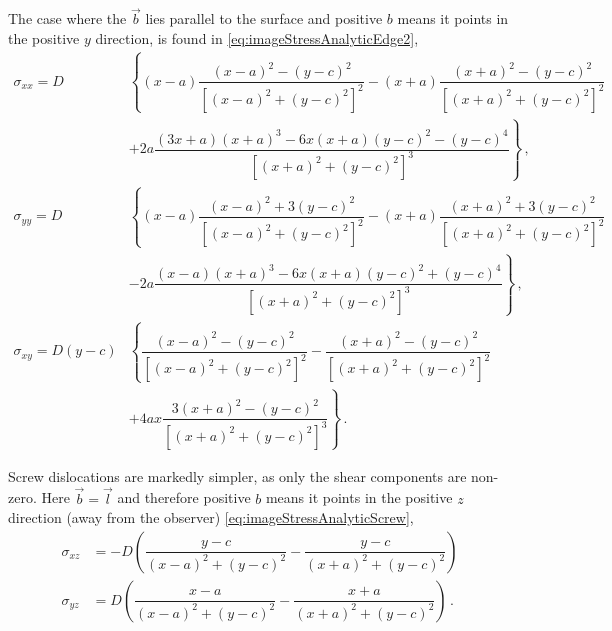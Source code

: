 \documentclass[11pt]{iopart}
\begin{document}
The case where the $\vec{b}$ lies parallel to the surface and positive $b$ means it points in the positive $y$ direction, is found in \cref{eq:imageStressAnalyticEdge2},
\begin{subequations}
    \begin{align}\label{eq:imageStressAnalyticEdge2}
        \sigma_{xx} = D         & \left\{ (x - a) \dfrac{(x - a)^2 - (y - c)^2}{[(x - a)^2 + (y - c)^2]^2} -(x + a) \dfrac{(x + a)^2 - (y - c)^2}{[(x + a)^2 + (y - c)^2]^2} \right.     \\\nonumber
                                & \left. + 2 a \dfrac{(3 x + a) (x + a)^3 - 6 x (x + a) (y - c)^2 - (y - c)^4}{[(x + a)^2 + (y - c)^2]^3}\right\}\,,                                     \\
        \sigma_{yy} = D         & \left\{ (x - a) \dfrac{(x - a)^2 + 3 (y - c)^2}{[(x - a)^2 + (y - c)^2]^2} - (x + a) \dfrac{(x + a)^2 + 3 (y - c)^2}{[(x + a)^2 + (y - c)^2]^2}\right. \\\nonumber
                                & \left. - 2 a \dfrac{(x - a) (x + a)^3 - 6 x (x + a) (y - c)^2 + (y - c)^4}{[(x + a)^2 + (y - c)^2]^3}\right\}\,,                                       \\
        \sigma_{xy} = D (y - c) & \left\{\dfrac{(x - a)^2 - (y - c)^2}{[(x - a)^2 + (y - c)^2]^2} - \dfrac{(x + a)^2 - (y - c)^2}{[(x + a)^2 + (y - c)^2]^2} \right.                     \\\nonumber
                                & \left. + 4 a x \dfrac{3 (x + a)^2 - (y - c)^2}{[(x + a)^2 + (y - c)^2]^3}\right\}\,.
    \end{align}
\end{subequations}

Screw dislocations are markedly simpler, as only the shear components are non-zero. Here $\vec{b} = \vec{l}$ and therefore positive $b$ means it points in the positive $z$ direction (away from the observer) \cref{eq:imageStressAnalyticScrew},
\begin{subequations}
    \begin{align}\label{eq:imageStressAnalyticScrew}
        \sigma_{xz} & = -D \left(\dfrac{y - c}{(x - a)^2 + (y - c)^2} - \dfrac{y - c}{(x + a)^2 + (y - c)^2}\right)   \\
        \sigma_{yz} & = D \left(\dfrac{x - a}{(x - a)^2 + (y - c)^2} - \dfrac{x + a}{(x + a)^2 + (y - c)^2}\right)\,.
    \end{align}
\end{subequations}
\end{document}
